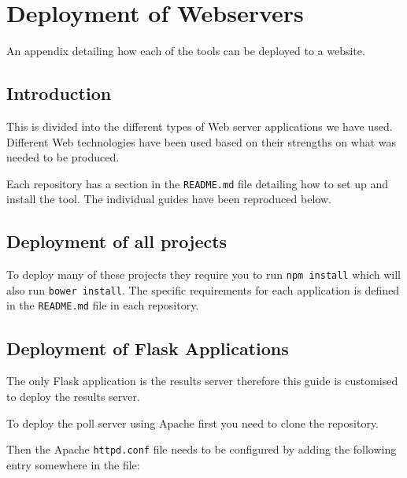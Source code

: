 \chapter{Deployment of Webservers} \label{App:Deployment of Webservers}
An appendix detailing how each of the tools can be deployed to a website.

\begin{preamble}
\end{preamble}

\section{Introduction}

This is divided into the different types of Web server applications we have used. Different Web technologies have been used based on their strengths on what was needed to be produced.

Each repository has a section in the \lstinline|README.md| file detailing how to set up and install the tool. The individual guides have been reproduced below.

\section{Deployment of all projects}

To deploy many of these projects they require you to run \lstinline|npm install| which will also run \lstinline|bower install|. The specific requirements for each application is defined in the \lstinline|README.md| file in each repository.

\section{Deployment of Flask Applications} \label{Section:Deployment Flask Applications}

The only Flask application is the results server therefore this guide is customised to deploy the results server.

To deploy the poll server using Apache first you need to clone the repository.

Then the Apache \lstinline|httpd.conf| file needs to be configured by adding the following entry somewhere in the file:

